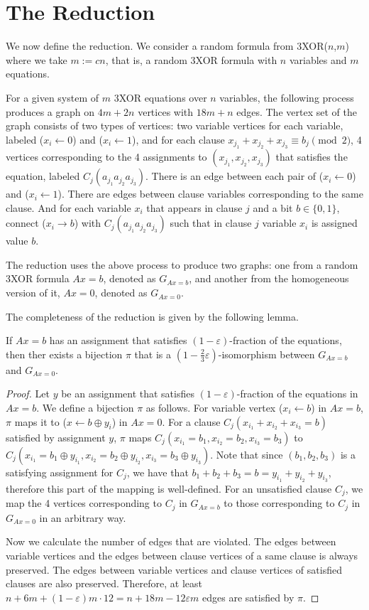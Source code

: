 \documentclass[a4paper,twoside,justified]{tufte-handout}
\begin{document}
\section{The Reduction}
We now define the reduction. We consider a random formula from 3XOR($n$,$m$) where we take $m:=cn$,
that is, a random 3XOR formula with $n$ variables and $m$ equations.

For a given system of $m$ 3XOR equations over $n$ variables, the following process produces a graph
on $4m+2n$ vertices with $18m+n$ edges. The vertex set of the graph consists of two types of vertices:
two variable vertices for each
variable, labeled ($x_i \leftarrow 0$) and ($x_i \leftarrow 1$),
and for each clause $x_{j_1}+x_{j_2}+x_{j_3} \equiv b_j \pmod{2}$, 4 vertices corresponding
to the 4 assignments to $(x_{j_1},x_{j_2},x_{j_3})$ that satisfies the equation,
labeled $C_j(a_{j_1} a_{j_2} a_{j_3})$.
There is an edge between each pair of ($x_i \leftarrow 0$) and ($x_i \leftarrow 1$).
There are edges between clause variables corresponding to the same clause. And for each variable
$x_i$ that appears in clause $j$ and a bit $b \in \{0,1\}$, connect
($x_i \rightarrow b$) with $C_j(a_{j_1} a_{j_2} a_{j_3})$ such that in clause $j$ variable $x_i$ is assigned
value $b$.

The reduction uses the above process to produce two graphs: one from a random 3XOR formula $Ax=b$,
denoted as $G_{Ax=b}$, and another from the homogeneous version of it, $Ax=0$, denoted as $G_{Ax=0}$.

The completeness of the reduction is given by the following lemma.
\begin{lemma}\label{lemma:completeness}
  If $Ax=b$ has an assignment that satisfies $(1-\varepsilon)$-fraction of the equations,
  then ther exists a bijection $\pi$ that is a $(1-\frac{2}{3}\varepsilon)$-isomorphism between 
  $G_{Ax=b}$ and $G_{Ax=0}$.
\end{lemma}
\begin{proof}
  Let $y$ be an assignment that satisfies $(1-\varepsilon)$-fraction of the equations in $Ax=b$. We define
  a bijection $\pi$ as follows.
  For variable vertex ($x_i \leftarrow b$) in $Ax=b$, $\pi$ maps it to ($x \leftarrow b \oplus y_i$)
  in $Ax=0$. For a clause $C_j(x_{i_1}+x_{i_2}+x_{i_3}=b)$ satisfied by assignment $y$, $\pi$ maps
  $C_j(x_{i_1}=b_1,x_{i_2}=b_2,x_{i_3}=b_3)$ to $C_j(x_{i_1}=b_1 \oplus y_{i_1}, x_{i_2}=b_2 \oplus y_{i_2}, x_{i_3}=b_3 \oplus y_{i_3})$.
  Note that since $(b_1,b_2,b_3)$ is a satisfying assignment for $C_j$, we have that
  $b_1+b_2+b_3 = b = y_{i_1}+y_{i_2}+y_{i_3}$, therefore this part of the mapping is well-defined.
  For an unsatisfied clause $C_j$, we map the 4 vertices corresponding to $C_j$ in $G_{Ax=b}$
  to those corresponding to $C_j$ in $G_{Ax=0}$ in an arbitrary way.

  Now we calculate the number of edges that are violated. The edges between variable vertices and the edges between
  clause vertices of a same clause is always preserved. The edges between variable vertices and clause vertices
  of satisfied clauses are also preserved. Therefore, at least $n+6m+(1-\varepsilon)m \cdot 12=n+18m-12\varepsilon m$ edges
  are satisfied by $\pi$.
\end{proof}
\end{document}
